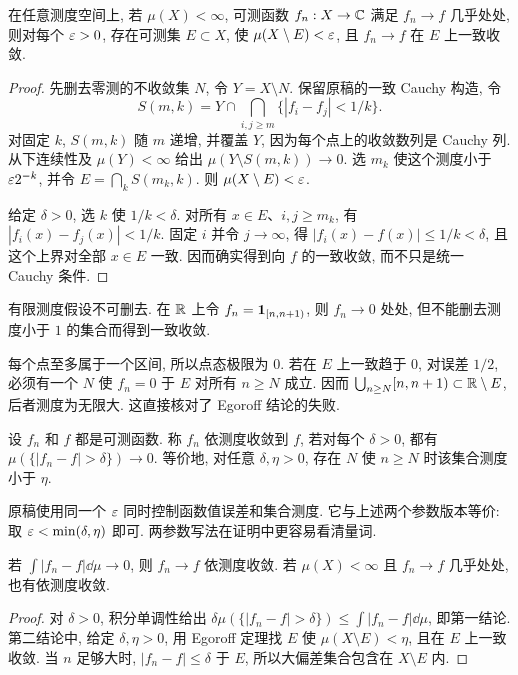 
\begin{theorem}[Egoroff]\label{ra:c4:egoroff}
在任意测度空间上, 若 $\mu(X)<\infty$, 可测函数 $f_n:X\to\mathbb C$ 满足 $f_n\to f$ 几乎处处, 则对每个 $\varepsilon>0$, 存在可测集 $E\subset X$, 使 $\mu(X\setminus E)<\varepsilon$, 且 $f_n\to f$ 在 $E$ 上一致收敛.
\end{theorem}
\begin{proof}
先删去零测的不收敛集 $N$, 令 $Y=X\setminus N$. 保留原稿的一致 Cauchy 构造, 令
\[
 S(m,k)=Y\cap\bigcap_{i,j\ge m}\{|f_i-f_j|<1/k\}.
\]
对固定 $k$, $S(m,k)$ 随 $m$ 递增, 并覆盖 $Y$, 因为每个点上的收敛数列是 Cauchy 列. 从下连续性及 $\mu(Y)<\infty$ 给出 $\mu(Y\setminus S(m,k))\to0$. 选 $m_k$ 使这个测度小于 $\varepsilon2^{-k}$, 并令 $E=\bigcap_kS(m_k,k)$. 则 $\mu(X\setminus E)<\varepsilon$.

给定 $\delta>0$, 选 $k$ 使 $1/k<\delta$. 对所有 $x\in E$、$i,j\ge m_k$, 有 $|f_i(x)-f_j(x)|<1/k$. 固定 $i$ 并令 $j\to\infty$, 得 $|f_i(x)-f(x)|\le1/k<\delta$, 且这个上界对全部 $x\in E$ 一致. 因而确实得到向 $f$ 的一致收敛, 而不只是统一 Cauchy 条件.
\end{proof}

\begin{example}\label{ra:c4:infinitemeasure}
有限测度假设不可删去. 在 $\mathbb R$ 上令 $f_n=\mathbf 1_{[n,n+1)}$, 则 $f_n\to0$ 处处, 但不能删去测度小于 $1$ 的集合而得到一致收敛.
\end{example}
\begin{solution}
每个点至多属于一个区间, 所以点态极限为 $0$. 若在 $E$ 上一致趋于 $0$, 对误差 $1/2$, 必须有一个 $N$ 使 $f_n=0$ 于 $E$ 对所有 $n\ge N$ 成立. 因而 $\bigcup_{n\ge N}[n,n+1)\subset\mathbb R\setminus E$, 后者测度为无限大. 这直接核对了 Egoroff 结论的失败.
\end{solution}


\begin{definition}\label{ra:c4:measureconv}
设 $f_n$ 和 $f$ 都是可测函数. 称 $f_n$ 依测度收敛到 $f$, 若对每个 $\delta>0$, 都有 $\mu(\{|f_n-f|>\delta\})\to0$. 等价地, 对任意 $\delta,\eta>0$, 存在 $N$ 使 $n\ge N$ 时该集合测度小于 $\eta$.
\end{definition}

原稿使用同一个 $\varepsilon$ 同时控制函数值误差和集合测度. 它与上述两个参数版本等价: 取 $\varepsilon<\min(\delta,\eta)$ 即可. 两参数写法在证明中更容易看清量词.

\begin{proposition}\label{ra:c4:l1measure}
若 $\int|f_n-f|\dd\mu\to0$, 则 $f_n\to f$ 依测度收敛. 若 $\mu(X)<\infty$ 且 $f_n\to f$ 几乎处处, 也有依测度收敛.
\end{proposition}
\begin{proof}
对 $\delta>0$, 积分单调性给出 $\delta\mu(\{|f_n-f|>\delta\})\le\int|f_n-f|\dd\mu$, 即第一结论. 第二结论中, 给定 $\delta,\eta>0$, 用 Egoroff 定理找 $E$ 使 $\mu(X\setminus E)<\eta$, 且在 $E$ 上一致收敛. 当 $n$ 足够大时, $|f_n-f|\le\delta$ 于 $E$, 所以大偏差集合包含在 $X\setminus E$ 内.
\end{proof}


